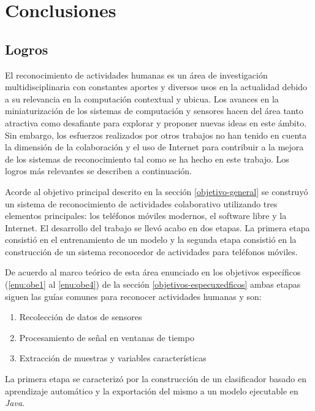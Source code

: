 
\chapter{Conclusiones}

\label{conclusiones-y-trabajos-futuros}

\section{Logros}

\label{conclusiones}

El reconocimiento de actividades humanas es un área de investigación
multidisciplinaria con constantes aportes y diversos usos en la actualidad
debido a su relevancia en la computación contextual y ubicua. Los
avances en la miniaturización de los sistemas de computación y sensores
hacen del área tanto atractiva como desafiante para explorar y proponer
nuevas ideas en este ámbito\cite{LaraLabrador2013}. Sin embargo,
los esfuerzos realizados por otros trabajos no han tenido en cuenta
la dimensión de la colaboración y el uso de Internet para contribuir
a la mejora de los sistemas de reconocimiento tal como se ha hecho
en este trabajo. Los logros más relevantes se describen a continuación.

Acorde al objetivo principal descrito en la sección \ref{objetivo-general}
se construyó un sistema de reconocimiento de actividades colaborativo
utilizando tres elementos principales: los teléfonos móviles modernos,
el software libre y la Internet. El desarrollo del trabajo se llevó
acabo en dos etapas. La primera etapa consistió en el entrenamiento
de un modelo y la segunda etapa consistió en la construcción de un
sistema reconocedor de actividades para teléfonos móviles.

De acuerdo al marco teórico de esta área enunciado en los objetivos
específicos (\ref{enu:obe1} al \ref{enu:obe4}) de la sección \ref{objetivos-especuxedficos}
ambas etapas siguen las guías comunes para reconocer actividades humanas
y son:
\begin{enumerate}
\item Recolección de datos de sensores
\item Procesamiento de señal en ventanas de tiempo
\item Extracción de muestras y variables características
\end{enumerate}
La primera etapa se caracterizó por la construcción de un clasificador
basado en aprendizaje automático y la exportación del mismo a un modelo
ejecutable en \emph{Java}.

